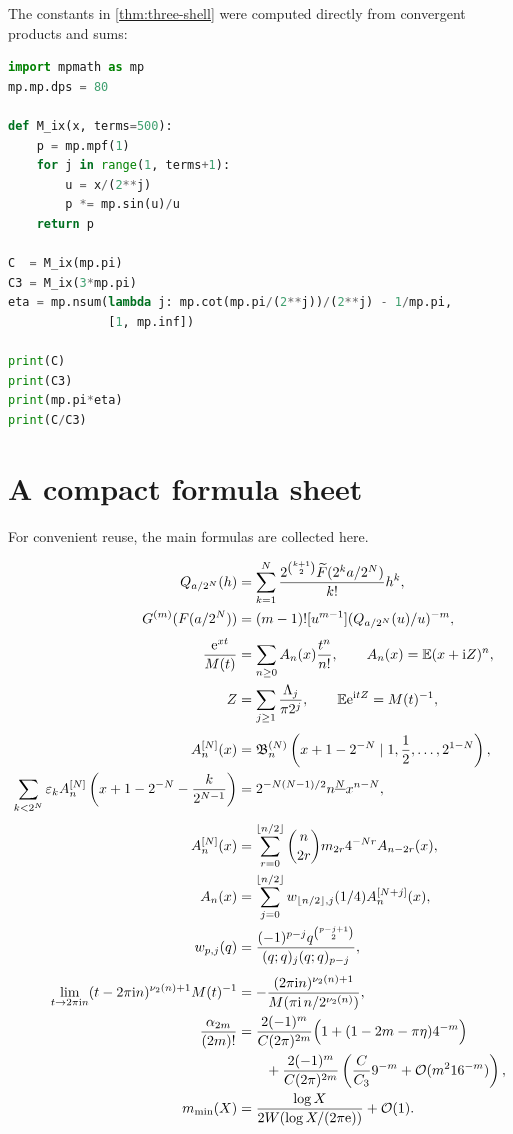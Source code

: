 \documentclass[11pt,oneside]{article}
\theoremstyle{frontier}
\theoremstyle{definition}
\theoremstyle{remark}
\newcommand{\e}{\mathrm e}
\newcommand{\ii}{\mathrm i}
\newcommand{\GF}{\widetilde F}
\newcommand{\vtwo}{\nu_2}
\newcommand{\eps}{\varepsilon}
\newcommand{\fall}[2]{#1^{\underline{#2}}}
\newcommand{\BigO}{\mathcal O}
\begin{document}
The constants in \cref{thm:three-shell} were computed directly from convergent products and sums:
\begin{lstlisting}[style=frontiercode,language=Python,caption={High-precision evaluation of the pole constants.}]
import mpmath as mp
mp.mp.dps = 80

def M_ix(x, terms=500):
    p = mp.mpf(1)
    for j in range(1, terms+1):
        u = x/(2**j)
        p *= mp.sin(u)/u
    return p

C  = M_ix(mp.pi)
C3 = M_ix(3*mp.pi)
eta = mp.nsum(lambda j: mp.cot(mp.pi/(2**j))/(2**j) - 1/mp.pi,
              [1, mp.inf])

print(C)
print(C3)
print(mp.pi*eta)
print(C/C3)
\end{lstlisting}

\section{A compact formula sheet}
\label{app:formula-sheet}

For convenient reuse, the main formulas are collected here.

\begin{align*}
 Q_{a/2^N}(h)
 &=\sum_{k=1}^{N}
 \frac{2^{\binom{k+1}{2}}\GF(2^ka/2^N)}{k!}h^k,\\
 G^{(m)}(F(a/2^N))
 &=(m-1)![u^{m-1}](Q_{a/2^N}(u)/u)^{-m},\\[0.3em]
 \frac{\e^{xt}}{M(t)}
 &=\sum_{n\ge0}A_n(x)\frac{t^n}{n!},
 \qquad
 A_n(x)=\mathbb E(x+\ii Z)^n,\\
 Z&=\sum_{j\ge1}\frac{\Lambda_j}{\pi2^j},
 \qquad
 \mathbb E\e^{\ii tZ}=M(t)^{-1},\\[0.3em]
 A_n^{[N]}(x)
 &=\mathfrak B_n^{(N)}
 \left(x+1-2^{-N}\mid1,\frac12,\ldots,2^{1-N}\right),\\
 \sum_{k<2^N}\eps_k
 A_n^{[N]}\left(x+1-2^{-N}-\frac{k}{2^{N-1}}\right)
 &=2^{-N(N-1)/2}\fall nN x^{n-N},\\[0.3em]
 A_n^{[N]}(x)
 &=\sum_{r=0}^{\lfloor n/2\rfloor}
 \binom n{2r}m_{2r}4^{-Nr}A_{n-2r}(x),\\
 A_n(x)
 &=\sum_{j=0}^{\lfloor n/2\rfloor}
 w_{\lfloor n/2\rfloor,j}(1/4)A_n^{[N+j]}(x),\\
 w_{p,j}(q)
 &=\frac{(-1)^{p-j}q^{\binom{p-j+1}{2}}}
 {(q;q)_j(q;q)_{p-j}},\\[0.3em]
 \lim_{t\to2\pi\ii n}(t-2\pi\ii n)^{\vtwo(n)+1}M(t)^{-1}
 &=-\frac{(2\pi\ii n)^{\vtwo(n)+1}}
 {M(\pi\ii\,n/2^{\vtwo(n)})},\\
 \frac{\alpha_{2m}}{(2m)!}
 &=\frac{2(-1)^m}{C(2\pi)^{2m}}
 \Bigl(1+(1-2m-\pi\eta)4^{-m}\Bigr)\\
 &\qquad+\frac{2(-1)^m}{C(2\pi)^{2m}}
 \left(\frac C{C_3}9^{-m}+\BigO(m^2 16^{-m})\right),\\
 m_{\min}(X)
 &=\frac{\log X}{2W(\log X/(2\pi\e))}+\BigO(1).
\end{align*}
\end{document}
